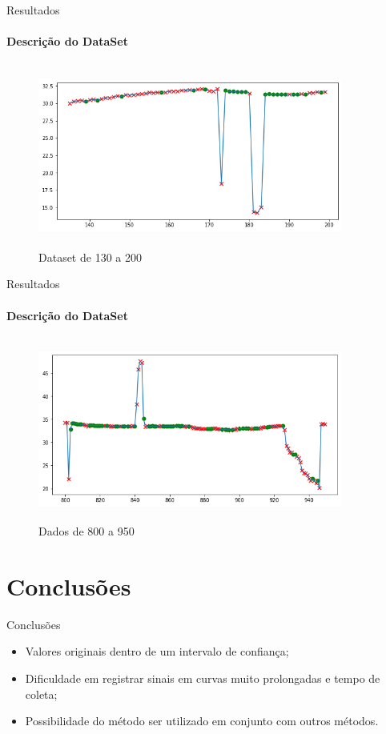\documentclass[]{beamer}
\begin{document}
\begin{frame}{Resultados}
	\framesubtitle{Descrição do DataSet}
	\begin{figure}[!htb]	
		\begin{center}
			\includegraphics[width=10cm,height=6cm]{../imagens/sensores/indice4.png}
		\end{center}
		\caption{Dataset de 130 a 200}
		\label{figura:bruto}
	\end{figure}	
\end{frame}

\begin{frame}{Resultados}
	\framesubtitle{Descrição do DataSet}
	\begin{figure}[!htb]	
		\begin{center}
			\includegraphics[width=10cm,height=6cm]{../imagens/sensores/indice3.png}
		\end{center}
		\caption{Dados de 800 a 950}
		\label{figura:bruto}
	\end{figure}	
\end{frame}

\section{Conclusões}
\begin{frame}{Conclusões}
	\begin{itemize}
		\item Valores originais dentro de um intervalo de confiança;
        \item Dificuldade em registrar sinais em curvas muito prolongadas e tempo de coleta;
		\item Possibilidade do método ser utilizado em conjunto com outros métodos.
        	
	\end{itemize}
\end{frame}
\end{document}

